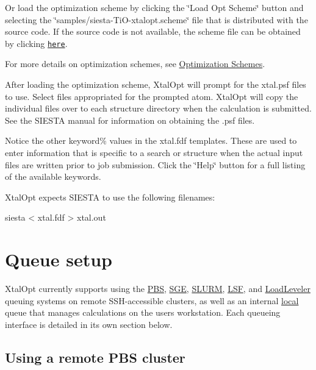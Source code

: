 Or load the optimization scheme by clicking the \char`\"{}\+Load Opt Scheme\char`\"{} button and selecting the \char`\"{}samples/siesta-\/\+Ti\+O-\/xtalopt.\+scheme\char`\"{} file that is distributed with the source code. If the source code is not available, the scheme file can be obtained by clicking \href{http://xtalopt.github.io/samples/siesta-TiO-xtalopt.scheme}{\tt here}.

For more details on optimization schemes, see \hyperlink{optschemes}{Optimization Schemes}.

After loading the optimization scheme, Xtal\+Opt will prompt for the xtal.\+psf files to use. Select files appropriated for the prompted atom. Xtal\+Opt will copy the individual files over to each structure directory when the calculation is submitted. See the S\+I\+E\+S\+T\+A manual for information on obtaining the .psf files.

Notice the other keyword\% values in the xtal.\+fdf templates. These are used to enter information that is specific to a search or structure when the actual input files are written prior to job submission. Click the \char`\"{}\+Help\char`\"{} button for a full listing of the available keywords.

Xtal\+Opt expects S\+I\+E\+S\+T\+A to use the following filenames\+:


\begin{DoxyPre}siesta < xtal.fdf > xtal.out\end{DoxyPre}
\hypertarget{tut-xo_qisetup}{}\section{Queue setup}\label{tut-xo_qisetup}
Xtal\+Opt currently supports using the \hyperlink{tut-xo_remotepbs}{P\+B\+S}, \hyperlink{tut-xo_remotesge}{S\+G\+E}, \hyperlink{tut-xo_remoteslurm}{S\+L\+U\+R\+M}, \hyperlink{tut-xo_remotelsf}{L\+S\+F}, and \hyperlink{tut-xo_remotell}{Load\+Leveler} queuing systems on remote S\+S\+H-\/accessible clusters, as well as an internal \hyperlink{tut-xo_localqi}{local} queue that manages calculations on the user\textquotesingle{}s workstation. Each queueing interface is detailed in its own section below.\hypertarget{tut-xo_remotepbs}{}\subsection{Using a remote P\+B\+S cluster}\label{tut-xo_remotepbs}
 
